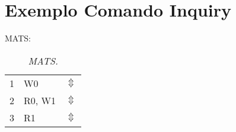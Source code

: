 \chapter{Exemplo Comando Inquiry} \label{APX:ATA}

MATS:

\begin{table}[!ht]
\caption{\emph{MATS.}}
\centering
\label{TAB:MATS}
\begin{tabular}{| c | l r |}
\hline
1 & W0 & $\Updownarrow$ \\
2 & R0, W1 & $\Updownarrow$ \\
3 & R1 & $\Updownarrow$ \\
\hline
\end{tabular}
\end{table}

